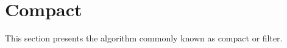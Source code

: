 \section{Compact}
\label{sec:compact}

This section presents the algorithm commonly known as compact or filter.





